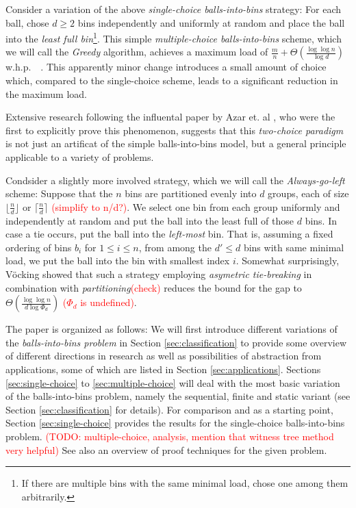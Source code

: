 \documentclass[a4paper,12pt]{article}
\newcommand\todo[1]{\textcolor{red}{(#1)}}
\begin{document}
Consider a variation of the above \emph{single-choice balls-into-bins} strategy: For each ball, chose $d \geq 2$ bins independently and uniformly at random and place the ball into the \emph{least full bin}\footnote{If there are multiple bins with the same minimal load, chose one among them arbitrarily.}. This simple \emph{multiple-choice balls-into-bins} scheme, which we will call the \emph{Greedy} algorithm, achieves a maximum load of $\frac{m}{n} + \Theta\left(\frac{\log \log n}{\log d}\right)$ w.h.p.~\cite{ABKU99}~\cite{BCSV06}. This apparently minor change introduces a small amount of choice which, compared to the single-choice scheme, leads to a significant reduction in the maximum load. 
\begin{comment}
Curiously, the exponential decrease in the gap is already achieved having just two choices (that is, $d=2$). Each additional choice decreases the bound for the maximum gap by just a constant factor~\cite{MRS01}. 
\end{comment}
Extensive research following the influental paper by Azar et. al \cite{ABKU99}, who were the first to explicitly prove this phenomenon, suggests that this \emph{two-choice paradigm} is not just an artificat of the simple balls-into-bins model, but a general principle applicable to a variety of problems. 

Condsider a slightly more involved strategy, which we will call the \emph{Always-go-left} scheme: Suppose that the $n$ bins are partitioned evenly into $d$ groups, each of size $\lfloor \frac{n}{d}\rfloor$ or $\lceil\frac{n}{d}\rceil$ \todo{simplify to n/d?}. We select one bin from each group uniformly and independently at random and put the ball into the least full of those $d$ bins. In case a tie occurs, put the ball into the \emph{left-most} bin. That is, assuming a fixed ordering of bins $b_i$ for $1 \leq i \leq n$, from among the $d' \leq d$ bins with same minimal load, we put the ball into the bin with smallest index $i$. Somewhat surprisingly, V\"ocking \cite{VOC03} showed that such a strategy employing \emph{asymetric tie-breaking} in combination with \emph{partitioning}\todo{check} reduces the bound for the gap to $\Theta \left( \frac{\log\log n}{d \log \Phi_d}\right)$ \todo{$\Phi_d$ is undefined}.

The paper is organized as follows: We will first introduce different variations of the \emph{balls-into-bins problem} in Section \ref{sec:classification} to provide some overview of different directions in research as well as possibilities of abstraction from applications, some of which are listed in Section \ref{sec:applications}. Sections \ref{sec:single-choice} to \ref{sec:multiple-choice} will deal with the most basic variation of the balls-into-bins problem, namely the sequential, finite and static variant (see Section \ref{sec:classification} for details). For comparison and as a starting point, Section \ref{sec:single-choice} provides the results for the single-choice balls-into-bins problem. \todo{TODO: multiple-choice, analysis, mention that witness tree method very helpful}  See also \cite{MRS01} an overview of proof techniques for the given problem.  
\end{document}

